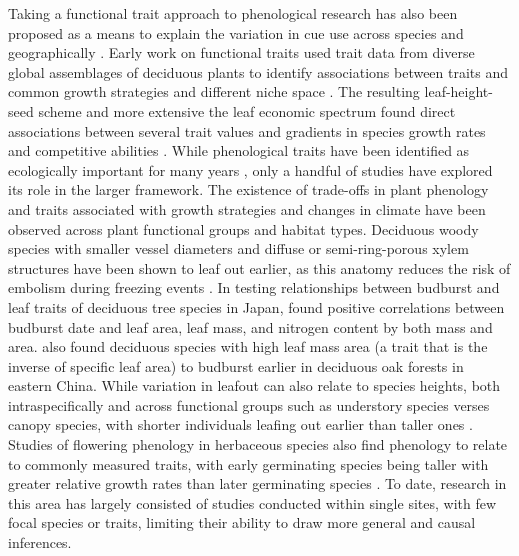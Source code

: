 \documentclass{article}\usepackage[]{graphicx}\usepackage[]{color}
\begin{document}
Taking a functional trait approach to phenological research has also been proposed as a means to explain the variation in cue use across species and geographically \citep{Flynn2018,Osada2017}. Early work on functional traits used trait data from diverse global assemblages of deciduous plants to identify associations between traits and common growth strategies and different niche space \citep{Westoby1998,Wright2004,Chave2009}. The resulting leaf-height-seed scheme and more extensive the leaf economic spectrum found direct associations between several trait values and gradients in species growth rates and competitive abilities \citep{Westoby1998,Wright2004,Diaz2016,Chave2009,Funk2016}. While phenological traits have been identified as ecologically important for many years \citep{Weiher1999, Laughlin2014}, only a handful of studies have explored its role in the larger framework. The existence of trade-offs in plant phenology and traits associated with growth strategies and changes in climate have been observed across plant functional groups and habitat types. Deciduous woody species with smaller vessel diameters and diffuse or semi-ring-porous xylem structures have been shown to leaf out earlier, as this anatomy reduces the risk of embolism during freezing events  \citep{Panchen2014, Lechowicz1984}. In testing relationships between budburst and leaf traits of deciduous tree species in Japan, \citep{Osada2017} found positive correlations between budburst date and leaf area, leaf mass, and nitrogen content by both mass and area. \citep{Sun2006} also found deciduous species with high leaf mass area (a trait that is the inverse of specific leaf area) to budburst earlier in deciduous oak forests in eastern China. %
While variation in leafout can also relate to species heights, both intraspecifically and across functional groups such as understory species verses canopy species, with shorter individuals leafing out earlier than taller ones \citep{Seiwa1998, 1999b}. Studies of flowering phenology in herbaceous species also find phenology to relate to commonly measured traits, with early germinating species being taller with greater relative growth rates than later germinating species \citep{Sun2011}. To date, research in this area has largely consisted of studies conducted within single sites, with few focal species or traits, limiting their ability to draw more general and causal inferences. 
\end{document}
